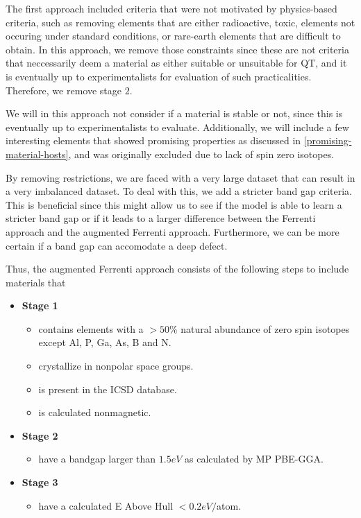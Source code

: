 The first approach included criteria that were not motivated by physics-based criteria, such as removing elements that are either radioactive, toxic, elements not occuring under standard conditions, or rare-earth elements that are difficult to obtain. In this approach, we remove those constraints since these are not criteria that neccessarily deem a material as either suitable or unsuitable for QT, and it is eventually up to experimentalists for evaluation of such practicalities. Therefore, we remove stage $2$.

We will in this approach not consider if a material is stable or not, since this is eventually up to experimentalists to evaluate. Additionally, we will include a few interesting elements that showed promising properties as discussed in \autoref{promising-material-hosts}, and was originally excluded due to lack of spin zero isotopes.

By removing restrictions, we are faced with a very large dataset that can result in a very imbalanced dataset. To deal with this, we add a stricter band gap criteria. This is beneficial since this might allow us to see if the model is able to learn a stricter band gap or if it leads to a larger difference between the Ferrenti approach and the augmented Ferrenti approach. Furthermore, we can be more certain if a band gap can accomodate a deep defect. %

Thus, the augmented Ferrenti approach consists of the following steps to include materials that

\begin{itemize}
  \item[]{\textbf{Stage 1}}
  \begin{itemize}
  \item contains elements with a $>50\%$ natural abundance of zero spin isotopes except Al, P, Ga, As, B and N.
  \item crystallize in nonpolar space groups.
  \item is present in the ICSD database.
  \item is calculated nonmagnetic.
  \end{itemize}
  \item[]{\textbf{Stage 2}}
  \begin{itemize}
  \item have a bandgap larger than $1.5eV$ as calculated by MP PBE-GGA.
  \end{itemize}
  \item[]{\textbf{Stage 3}}
  \begin{itemize}
  \item have a calculated E Above Hull $<0.2eV/$atom.
  \end{itemize}
\end{itemize}

